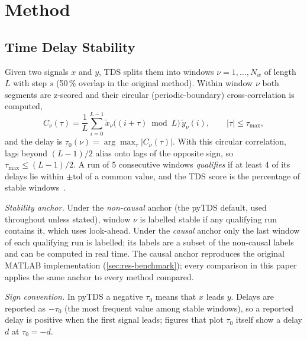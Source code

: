 \documentclass[11pt,a4paper]{article}
\begin{document}
\section{Method}
\label{sec:method}

\subsection{Time Delay Stability}
\label{sec:tds}
Given two signals $x$ and $y$, TDS splits them into windows $\nu = 1, \dots, N_w$ of length $L$ with step $s$ (50\,\% overlap in the original method). Within window $\nu$ both segments are z-scored and their circular (periodic-boundary) cross-correlation is computed,
\begin{equation}
C_\nu(\tau) = \frac{1}{L} \sum_{i=0}^{L-1} \tilde{x}_\nu\big((i+\tau) \bmod L\big)\, \tilde{y}_\nu(i), \qquad |\tau| \le \tau_{\max} ,
\label{eq:xcorr}
\end{equation}
and the delay is $\tau_0(\nu) = \arg\max_\tau |C_\nu(\tau)|$. With this circular correlation, lags beyond $(L-1)/2$ alias onto lags of the opposite sign, so $\tau_{\max} \le (L-1)/2$. A run of 5 consecutive windows \emph{qualifies} if at least 4 of its delays lie within $\pm\mathrm{tol}$ of a common value, and the TDS score is the percentage of stable windows~\cite{Bashan2012NetworkPhysiology,Bartsch2015NetworkPhysiology}.

\emph{Stability anchor.} Under the \emph{non-causal} anchor (the pyTDS default, used throughout unless stated), window $\nu$ is labelled stable if any qualifying run contains it, which uses look-ahead. Under the \emph{causal} anchor only the last window of each qualifying run is labelled; its labels are a subset of the non-causal labels and can be computed in real time. The causal anchor reproduces the original MATLAB implementation (\cref{sec:res-benchmark}); every comparison in this paper applies the same anchor to every method compared.

\emph{Sign convention.} In pyTDS a negative $\tau_0$ means that $x$ leads $y$. Delays are reported as $-\tau_0$ (the most frequent value among stable windows), so a reported delay is positive when the first signal leads; figures that plot $\tau_0$ itself show a delay $d$ at $\tau_0 = -d$.
\end{document}
